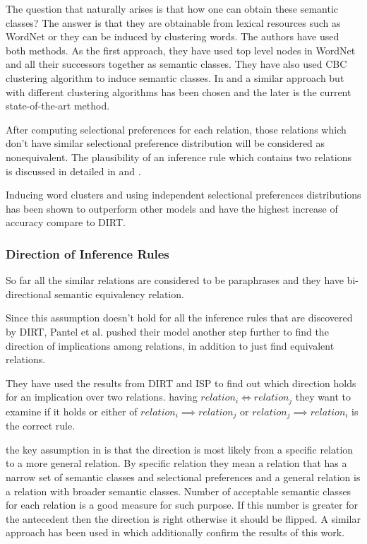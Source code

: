 The question that naturally arises is that how one can obtain these semantic classes? The answer is that
they are obtainable from lexical resources such as WordNet or they can be induced by clustering words.
The authors have used both methods. As the first approach, they have used top level nodes in WordNet and all their successors together
as semantic classes. They have also used CBC clustering algorithm \cite{Pantel2002} to induce semantic classes. 
In \cite{Brown1992} and \cite{Lin2009} a similar approach but with different clustering algorithms has been chosen 
and the later is the current state-of-the-art method. 

After computing selectional preferences for each relation, those relations which don't have similar selectional preference
distribution will be considered as nonequivalent. The plausibility of an inference rule which contains two relations is
discussed in detailed in \cite{Bhagat2007} and \cite{Kotlerman2010} .

Inducing word clusters and using independent selectional preferences distributions has been shown to outperform other models
and have the highest increase of accuracy compare to DIRT.     

\subsubsection{Direction of Inference Rules}
\label{ssec:dirt-improve}
So far all the similar relations are considered to be paraphrases and they have bi-directional semantic equivalency relation.

Since this assumption doesn't hold for all the inference rules that are discovered by DIRT, Pantel et al. pushed their model
another step further to find the direction of implications among relations, in addition to just find equivalent relations.

They have used the results from DIRT and ISP to find out which direction holds for an implication over two relations.
having $relation_i \iff relation_j$ they want to examine if it holds or either of $relation_i \implies relation_j$
or $relation_j \implies relation_i$ is the correct rule. 

the key assumption in \cite{Bhagat2007} is that the direction is most likely from a specific relation to a more general relation.
By specific relation they mean a relation that has a narrow set of semantic classes and selectional preferences and 
a general relation is a relation with broader semantic classes. Number of acceptable semantic classes for each relation is a 
good measure for such purpose. If this number is greater for the antecedent then the direction is right otherwise it should be flipped.
A similar approach has been used in \cite{Kotlerman2010} which additionally confirm the results of this work.

